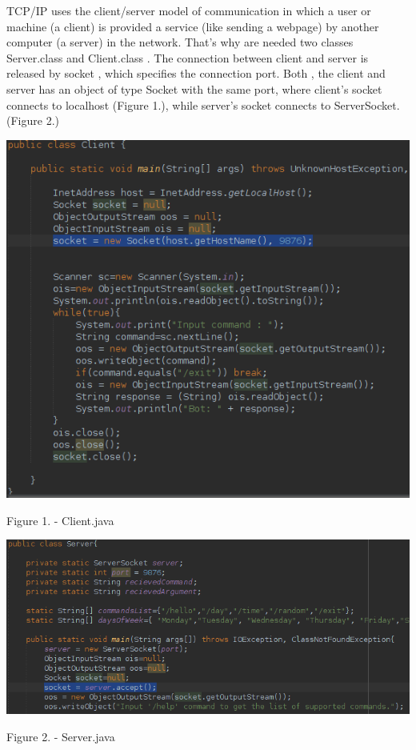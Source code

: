 \documentclass[12pt]{article}
\begin{document}
	TCP/IP uses the client/server model of communication in which a user or machine (a client) is provided a service (like sending a webpage) by another computer (a server) in the network. That's why are needed two classes Server.class and Client.class . The connection between client and server is released by socket , which specifies the connection port. 
	Both , the client and server has an object of type Socket with the same port, where client's socket connects to localhost (Figure 1.), while server's socket connects to ServerSocket.(Figure 2.)
	\begin{center}
		\includegraphics[scale=0.6]{clientSocket}
		
		Figure 1. - Client.java
	\end{center}
	\begin{center}
		\includegraphics[scale=0.6]{serverSocket}
		
		Figure 2. - Server.java
	\end{center}
	
\end{document}
